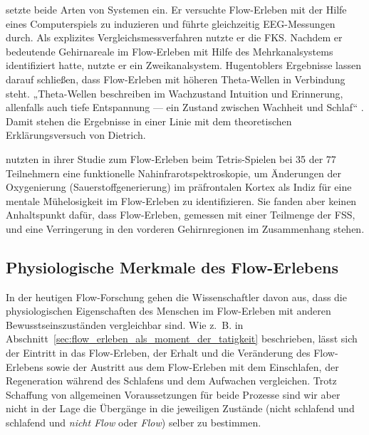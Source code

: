 \citet{Hugentobler2011} setzte beide Arten von Systemen ein. Er versuchte Flow-Erleben mit der Hilfe eines Computerspiels zu induzieren und führte gleichzeitig \ac{EEG}-Messungen durch. Als explizites Vergleichsmessverfahren nutzte er die \ac{FKS}. Nachdem er bedeutende Gehirnareale im Flow-Erleben mit Hilfe des Mehrkanalsystems identifiziert hatte, nutzte er ein Zweikanalsystem. Hugentoblers Ergebnisse lassen darauf schließen, dass Flow-Erleben mit höheren Theta-Wellen in Verbindung steht. „Theta-Wellen beschreiben im Wachzustand Intuition und Erinnerung, allenfalls auch tiefe Entspannung — ein Zustand zwischen Wachheit und Schlaf“ \citep[S.~149]{Hugentobler2011}. Damit stehen die Ergebnisse in einer Linie mit dem theoretischen Erklärungsversuch von Dietrich.

\citet{Harmat2015} nutzten in ihrer Studie zum Flow-Erleben beim Tetris-Spielen bei 35 der 77 Teilnehmern eine funktionelle Nahinfrarotspektroskopie, um Änderungen der Oxygenierung (Sauerstoffgenerierung) im präfrontalen Kortex als Indiz für eine mentale Mühelosigkeit im Flow-Erleben zu identifizieren. Sie fanden aber keinen Anhaltspunkt dafür, dass Flow-Erleben, gemessen mit einer Teilmenge der \ac{FSS}, und eine Verringerung in den vorderen Gehirnregionen im Zusammenhang stehen.

\subsection{Physiologische Merkmale des Flow-Erlebens} 

\label{sub:physiologische_merkmale_des_flow_erlebens}

In der heutigen Flow-Forschung gehen die Wissenschaftler davon aus, dass die physiologischen Eigenschaften des Menschen im Flow-Erleben mit anderen Bewusstseinszuständen vergleichbar sind. Wie z.~B. in Abschnitt~\ref{sec:flow_erleben_als_moment_der_tatigkeit} beschrieben, lässt sich der Eintritt in das Flow-Erleben, der Erhalt und die Veränderung des Flow-Erlebens sowie der Austritt aus dem Flow-Erleben mit dem Einschlafen, der Regeneration während des Schlafens und dem Aufwachen vergleichen. Trotz Schaffung von allgemeinen Voraussetzungen für beide Prozesse sind wir aber nicht in der Lage die Übergänge in die jeweiligen Zustände (nicht schlafend und schlafend und \emph{nicht Flow} oder \emph{Flow}) selber zu bestimmen.

